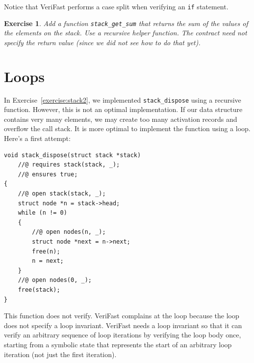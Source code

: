 \documentclass{article}
\newtheorem{exercise}{Exercise}
\begin{document}
Notice that VeriFast performs a case split when verifying an
\lstinline!if! statement.

\begin{exercise}\label{exercise:stack4}
Add a function \lstinline!stack_get_sum! that returns the sum
of the values of the elements on the stack. Use a recursive
helper function. The contract need not specify the return value
(since we did not see how to do that yet).
\end{exercise}

\section{Loops}

In Exercise~\ref{exercise:stack2}, we implemented
\lstinline!stack_dispose! using a recursive function. However,
this is not an optimal implementation. If our data structure
contains very many elements, we may create too many activation
records and overflow the call stack. It is more optimal to
implement the function using a loop. Here's a first attempt:
\begin{lstlisting}
void stack_dispose(struct stack *stack)
    //@ requires stack(stack, _);
    //@ ensures true;
{
    //@ open stack(stack, _);
    struct node *n = stack->head;
    while (n != 0)
    {
        //@ open nodes(n, _);
        struct node *next = n->next;
        free(n);
        n = next;
    }
    //@ open nodes(0, _);
    free(stack);
}
\end{lstlisting}
This function does not verify. VeriFast complains at the loop
because the loop does not specify a loop invariant. VeriFast
needs a loop invariant so that it can verify an arbitrary
sequence of loop iterations by verifying the loop body once,
starting from a symbolic state that represents the start of an
arbitrary loop iteration (not just the first iteration).
\end{document}
